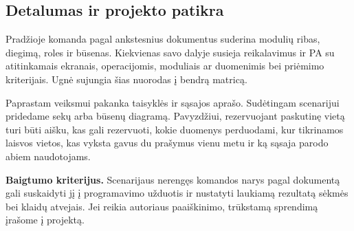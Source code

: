 \documentclass[10pt,a4paper]{article}
\begin{document}
\subsection*{Detalumas ir projekto patikra}

Pradžioje komanda pagal ankstesnius dokumentus suderina modulių ribas, diegimą,
roles ir būsenas. Kiekvienas savo dalyje susieja reikalavimus ir PA su
atitinkamais ekranais, operacijomis, moduliais ar duomenimis bei priėmimo
kriterijais. Ugnė sujungia šias nuorodas į bendrą matricą.

Paprastam veiksmui pakanka taisyklės ir sąsajos aprašo. Sudėtingam scenarijui
pridedame sekų arba būsenų diagramą. Pavyzdžiui, rezervuojant paskutinę
vietą turi būti aišku, kas gali rezervuoti, kokie duomenys perduodami,
kur tikrinamos laisvos vietos, kas vyksta gavus du prašymus vienu metu
ir ką sąsaja parodo abiem naudotojams.

\textbf{Baigtumo kriterijus.} Scenarijaus nerengęs komandos narys pagal
dokumentą gali suskaidyti jį į programavimo užduotis ir nustatyti laukiamą
rezultatą sėkmės bei klaidų atvejais. Jei reikia autoriaus paaiškinimo,
trūkstamą sprendimą įrašome į projektą.
\end{document}
